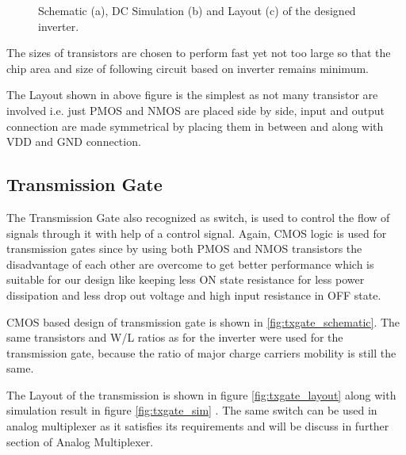 \documentclass[parskip,oneside,colorbacktitle,10pt,accentcolor=tud1b]{tudreport}
\begin{document}
{\begin{figure}[H]
\begin{center}
{        }
       \caption{Schematic (a), DC Simulation (b) and Layout (c) of the designed inverter.}
       \label{fig:inverter}
    \end{center}
\end{figure}

The sizes of transistors are chosen to perform fast yet not too large so that the chip area and size of following circuit based on inverter remains minimum.

The Layout shown in above figure is the simplest as not many transistor are involved i.e. just PMOS and NMOS are placed side by side, input and output connection are made symmetrical by placing them in between and along with VDD and GND connection.

\subsection{Transmission Gate}

The Transmission Gate also recognized as switch, is used to control the flow of signals through it with help of a control signal. Again, CMOS logic is used for transmission gates since by using both PMOS and NMOS transistors the disadvantage of each other are overcome to get better performance which is suitable for our design like keeping less ON state resistance for less power dissipation and less drop out voltage and high input resistance in OFF state. 

CMOS based design of transmission gate is shown in \ref{fig:txgate_schematic}. The same transistors and W/L ratios as for the inverter were used for the transmission gate, because the ratio of major charge carriers mobility is still the same. 

The Layout of the transmission is shown in figure \ref{fig:txgate_layout} along with simulation result in figure \ref{fig:txgate_sim} . The same switch can be used in analog multiplexer as it satisfies its requirements and will be discuss in further section of Analog Multiplexer.

}
\end{document}
